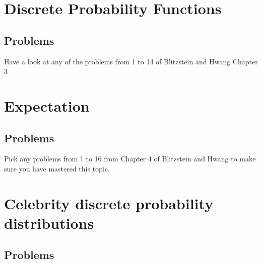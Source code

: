 \documentclass[12pt]{extbook}
\begin{document}
\chapter{Discrete Probability Functions}


\section{Problems}

Have a look at any of the problems from 1 to 14 of Blitzstein and Hwang Chapter 3



\chapter{Expectation}


\section{Problems}

\begin{enumerate}




\end{enumerate}


Pick any problems from 1 to 16 from Chapter 4 of Blitzstein and Hwang to make sure you have mastered this topic.


\chapter{Celebrity discrete probability distributions}



\section{Problems}

\begin{enumerate}












\end{enumerate}
\end{document}
